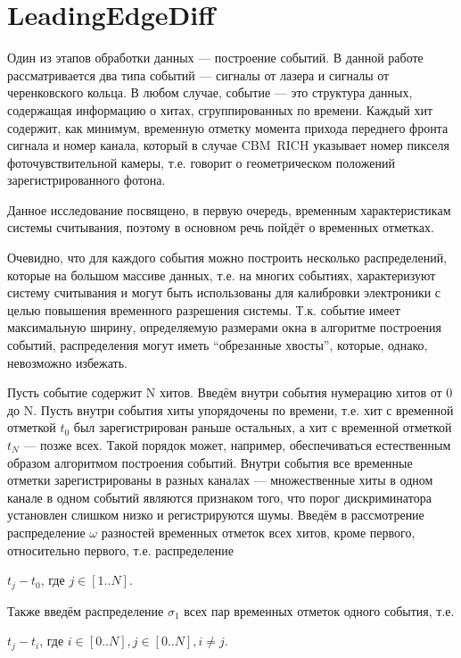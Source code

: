 \section{LeadingEdgeDiff}\label{sec:secLeadingEdgeDiff}

Один из этапов обработки данных --- построение событий. В данной работе рассматривается два типа событий --- сигналы от лазера и сигналы от черенковского кольца. В любом случае, событие --- это структура данных, содержащая информацию о хитах, сгруппированных по времени. Каждый хит содержит, как минимум, временную отметку момента прихода переднего фронта сигнала и номер канала, который в случае CBM~RICH указывает номер пикселя фоточувствительной камеры, т.е. говорит о геометрическом положений зарегистрированного фотона.

Данное исследование посвящено, в первую очередь, временным характеристикам системы считывания, поэтому в основном речь пойдёт о временных отметках.

Очевидно, что для каждого события можно построить несколько распределений, которые на большом массиве данных, т.е. на многих событиях, характеризуют систему считывания и могут быть использованы для калибровки электроники с целью повышения временного разрешения системы. Т.к. событие имеет максимальную ширину, определяемую размерами окна в алгоритме построения событий, распределения могут иметь ``обрезанные хвосты'', которые, однако, невозможно избежать.

Пусть событие содержит N хитов. Введём внутри события нумерацию хитов от 0 до N. Пусть внутри события хиты упорядочены по времени, т.е. хит с временной отметкой $ t_{0} $ был зарегистрирован раньше остальных, а хит с временной отметкой $ t_{N} $ --- позже всех. Такой порядок может, например, обеспечиваться естественным образом алгоритмом построения событий. Внутри события все временные отметки зарегистрированы в разных каналах --- множественные хиты в одном канале в одном событий являются признаком того, что порог дискриминатора установлен слишком низко и регистрируются шумы. Введём в рассмотрение распределение $ \omega $ разностей временных отметок всех хитов, кроме первого, относительно первого, т.е. распределение

{\centering
$ t_{j} - t_{0} $, где  $ j \in [1..N] $.\\
}

Также введём распределение $ \sigma_{1} $ всех пар временных отметок одного события, т.е.

{\centering
$ t_{j}-t_{i} $, где $ i \in [0..N], j \in [0..N], i \neq j $.\\
}


